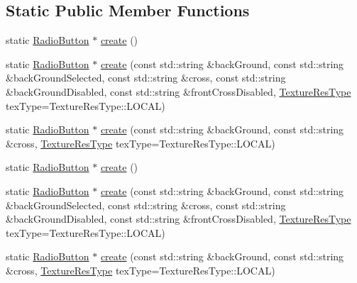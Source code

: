 \subsection*{Static Public Member Functions}
\begin{DoxyCompactItemize}
\item 
static \hyperlink{classui_1_1RadioButton}{Radio\+Button} $\ast$ \hyperlink{classui_1_1RadioButton_ae963da2266050872da18d4f5cbc9aae8}{create} ()
\item 
static \hyperlink{classui_1_1RadioButton}{Radio\+Button} $\ast$ \hyperlink{classui_1_1RadioButton_adf995938f51bf1ece6ed0de96a4c15dc}{create} (const std\+::string \&back\+Ground, const std\+::string \&back\+Ground\+Selected, const std\+::string \&cross, const std\+::string \&back\+Ground\+Disabled, const std\+::string \&front\+Cross\+Disabled, \hyperlink{classui_1_1Widget_a040a65ec5ad3b11119b7e16b98bd9af0}{Texture\+Res\+Type} tex\+Type=Texture\+Res\+Type\+::\+L\+O\+C\+AL)
\item 
static \hyperlink{classui_1_1RadioButton}{Radio\+Button} $\ast$ \hyperlink{classui_1_1RadioButton_a3e5bfaa171f2ec1c8f09c42a6390462d}{create} (const std\+::string \&back\+Ground, const std\+::string \&cross, \hyperlink{classui_1_1Widget_a040a65ec5ad3b11119b7e16b98bd9af0}{Texture\+Res\+Type} tex\+Type=Texture\+Res\+Type\+::\+L\+O\+C\+AL)
\item 
static \hyperlink{classui_1_1RadioButton}{Radio\+Button} $\ast$ \hyperlink{classui_1_1RadioButton_af2666c6f2f2612d386ec8daad7404e61}{create} ()
\item 
static \hyperlink{classui_1_1RadioButton}{Radio\+Button} $\ast$ \hyperlink{classui_1_1RadioButton_a23208817e079e2c09060990d161fed38}{create} (const std\+::string \&back\+Ground, const std\+::string \&back\+Ground\+Selected, const std\+::string \&cross, const std\+::string \&back\+Ground\+Disabled, const std\+::string \&front\+Cross\+Disabled, \hyperlink{classui_1_1Widget_a040a65ec5ad3b11119b7e16b98bd9af0}{Texture\+Res\+Type} tex\+Type=Texture\+Res\+Type\+::\+L\+O\+C\+AL)
\item 
static \hyperlink{classui_1_1RadioButton}{Radio\+Button} $\ast$ \hyperlink{classui_1_1RadioButton_a9e8b7c5996ad7b5e00f70977c72e4e19}{create} (const std\+::string \&back\+Ground, const std\+::string \&cross, \hyperlink{classui_1_1Widget_a040a65ec5ad3b11119b7e16b98bd9af0}{Texture\+Res\+Type} tex\+Type=Texture\+Res\+Type\+::\+L\+O\+C\+AL)
\end{DoxyCompactItemize}
